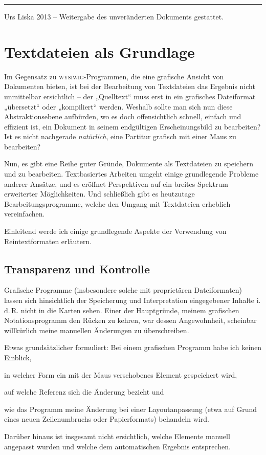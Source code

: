 \documentclass[DIV=12]{scrreprt}
\begin{document}
\vfill
\hrule
\medskip
\textcopyright{} Urs Liska 2013 -- Weitergabe des unveränderten Dokuments gestattet.

\tableofcontents

\chapter{Textdateien als Grundlage}
\label{chap:pt_plain-text-format}
Im Gegensatz zu \textsc{wysiwig}-Programmen, die eine grafische Ansicht von Dokumenten bieten, ist bei der Bearbeitung von Textdateien das Ergebnis nicht unmittelbar ersichtlich -- der „Quelltext“ muss erst in ein grafisches Dateiformat „übersetzt“ oder „kompiliert“ werden.
Weshalb sollte man sich nun diese Abstraktionsebene aufbürden, wo es doch offensichtlich schnell, einfach und effizient ist, ein Dokument in seinem endgültigen Erscheinungsbild zu bearbeiten?
Ist es nicht nachgerade \emph{natürlich}, eine Partitur grafisch mit einer Maus zu bearbeiten?

Nun, es gibt eine Reihe guter Gründe, Dokumente als Textdateien zu speichern und zu bearbeiten.
Textbasiertes Arbeiten umgeht einige grundlegende Probleme anderer Ansätze, und es eröffnet Perspektiven auf ein breites Spektrum erweiterter Möglichkeiten.
Und schließlich gibt es heutzutage Bearbeitungsprogramme, welche den Umgang mit Textdateien erheblich vereinfachen.

Einleitend werde ich einige grundlegende Aspekte der Verwendung von Reintextformaten erläutern.

\section*{Transparenz und Kontrolle}
\label{sec:pt_transparency-and-control}
Grafische Programme (insbesondere solche mit proprietären Dateiformaten) lassen sich hinsichtlich der Speicherung und Interpretation eingegebener Inhalte i.\,d.\,R. nicht in die Karten sehen.
Einer der Hauptgründe, meinem grafischen Notationsprogramm den Rücken zu kehren, war dessen Angewohnheit, scheinbar willkürlich meine manuellen Änderungen zu überschreiben.

Etwas grundsätzlicher formuliert: Bei einem grafischen Programm habe ich keinen Einblick, 
\begin{inparaenum}[1)]
\item in welcher Form ein mit der Maus verschobenes Element gespeichert wird,
\item auf welche Referenz sich die Änderung bezieht und
\item wie das Programm meine Änderung bei einer Layoutanpassung (etwa auf Grund eines neuen Zeilenumbruchs oder Papierformats) behandeln wird.
\end{inparaenum}
Darüber hinaus ist insgesamt nicht ersichtlich, welche Elemente manuell angepasst wurden und welche dem automatischen Ergebnis entsprechen.
\end{document}
